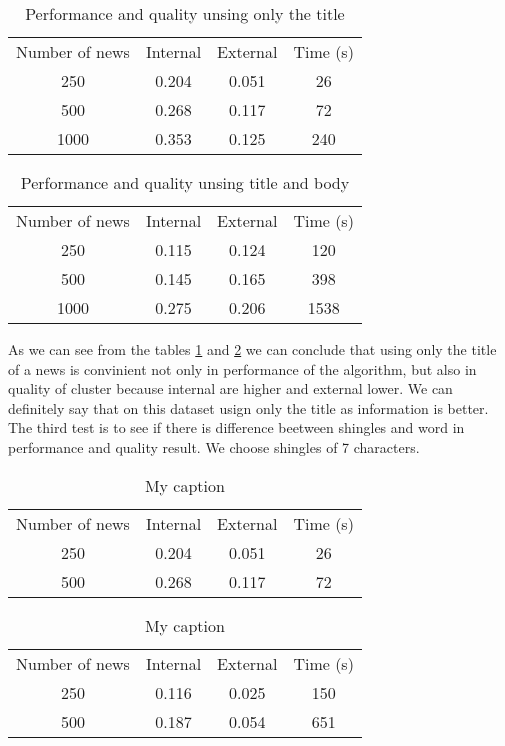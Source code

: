 \documentclass{acm_proc_article-sp}
\begin{document}
\begin{table}[!ht]
\centering
\label{table:title}
\begin{tabular}{cccc}
Number of news & Internal & External & Time (s) \\
250            & 0.204    & 0.051    & 26       \\
500            & 0.268    & 0.117    & 72       \\
1000           & 0.353    & 0.125    & 240      \\
\end{tabular}
\caption{Performance and quality unsing only the title}
\end{table}

\begin{table}[!ht]
\centering
\label{table:body}
\begin{tabular}{cccc}
Number of news & Internal & External & Time (s) \\
250            & 0.115    & 0.124    & 120      \\
500            & 0.145    & 0.165    & 398      \\
1000           & 0.275    & 0.206    & 1538 
\end{tabular}
\caption{Performance and quality unsing title and body}
\end{table}

As we can see from the tables \ref{table:title} and \ref{table:body} we can conclude that using only the title of a news is convinient not only in performance of the algorithm, but also in quality of cluster because internal are higher and external lower. We can definitely say that on this dataset usign only the title as information is better.
The third test is to see if there is difference beetween shingles and word in performance and quality result. We choose shingles of 7 characters.
\begin{table}[]
\centering
\caption{My caption}
\label{my-label}
\begin{tabular}{cccc}
Number of news & Internal & External & Time (s) \\
250            & 0.204    & 0.051    & 26       \\
500            & 0.268    & 0.117    & 72       \\
\end{tabular}
\end{table}

\begin{table}[]
\centering
\caption{My caption}
\label{my-label}
\begin{tabular}{cccc}
Number of news & Internal & External & Time (s) \\
250            & 0.116    & 0.025    & 150      \\
500            & 0.187    & 0.054    & 651      \\
\end{tabular}
\end{table}
\end{document}
